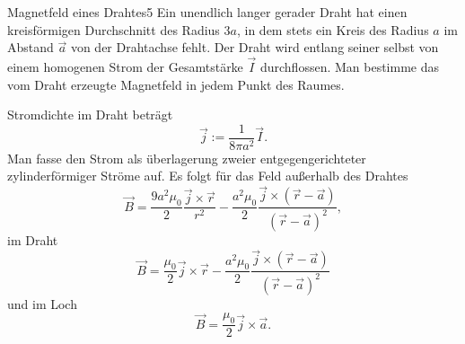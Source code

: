 \begin{problem}{Magnetfeld eines Drahtes}{5}
Ein unendlich langer gerader Draht hat einen kreisförmigen Durchschnitt des Radius $3a$, in dem stets ein Kreis des Radius $a$ im Abstand $\vec a$ von der Drahtachse fehlt. Der Draht wird entlang seiner selbst von einem homogenen Strom der Gesamtstärke $\vec I$ durchflossen. Man bestimme das vom Draht erzeugte Magnetfeld in jedem Punkt des Raumes.
\begin{solution}
Stromdichte im Draht beträgt
\[
\vec{j}:=\frac{1}{8\pi a^2}\vec{I}.
\]
Man fasse den Strom als überlagerung zweier entgegengerichteter zylinderförmiger Ströme auf. Es folgt für das Feld außerhalb des Drahtes
\[
\vec{B}=\frac{9 a^2 \mu_0}{2} \frac{\vec{j}\times\vec{r}}{r^2}-\frac{a^2 \mu_0}{2}\frac{\vec{j} \times (\vec{r}-\vec{a})}{(\vec{r}-\vec{a})^2},
\]
im Draht
\[
\vec{B}=\frac{\mu_0}{2} \vec{j}\times\vec{r}-\frac{a^2 \mu_0}{2}\frac{\vec{j} \times (\vec{r}-\vec{a})}{(\vec{r}-\vec{a})^2}
\]
und im Loch
\[
\vec{B}=\frac{\mu_0}{2} \vec{j}\times\vec{a}.
\]
\end{solution}
\end{problem}

